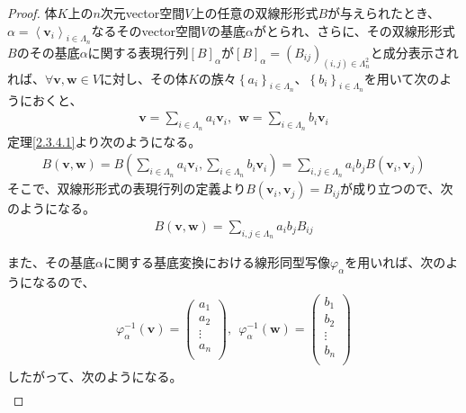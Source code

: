 \documentclass[dvipdfmx]{jsarticle}
\begin{document}
\begin{proof}
体$K$上の$n$次元vector空間$V$上の任意の双線形形式$B$が与えられたとき、$\alpha = \left\langle \mathbf{v}_{i} \right\rangle_{i \in \varLambda_{n}}$なるそのvector空間$V$の基底$\alpha$がとられ、さらに、その双線形形式$B$のその基底$\alpha$に関する表現行列$[ B]_{\alpha}$が$[ B]_{\alpha} = \left( B_{ij} \right)_{(i,j) \in \varLambda_{n}^{2}}$と成分表示されれば、$\forall\mathbf{v},\mathbf{w} \in V$に対し、その体$K$の族々$\left\{ a_{i} \right\}_{i \in \varLambda_{n}}$、$\left\{ b_{i} \right\}_{i \in \varLambda_{n}}$を用いて次のようにおくと、
\begin{align*}
\mathbf{v} = \sum_{i \in \varLambda_{n}} {a_{i}\mathbf{v}_{i}},\ \ \mathbf{w} = \sum_{i \in \varLambda_{n}} {b_{i}\mathbf{v}_{i}}
\end{align*}
定理\ref{2.3.4.1}より次のようになる。
\begin{align*}
B\left( \mathbf{v},\mathbf{w} \right) = B\left( \sum_{i \in \varLambda_{n}} {a_{i}\mathbf{v}_{i}},\sum_{i \in \varLambda_{n}} {b_{i}\mathbf{v}_{i}} \right) = \sum_{i,j \in \varLambda_{n}} {a_{i}b_{j}B\left( \mathbf{v}_{i},\mathbf{v}_{j} \right)}
\end{align*}
そこで、双線形形式の表現行列の定義より$B\left( \mathbf{v}_{i},\mathbf{v}_{j} \right) = B_{ij}$が成り立つので、次のようになる。
\begin{align*}
B\left( \mathbf{v},\mathbf{w} \right) = \sum_{i,j \in \varLambda_{n}} {a_{i}b_{j}B_{ij}}
\end{align*}\par
また、その基底$\alpha$に関する基底変換における線形同型写像$\varphi_{\alpha}$を用いれば、次のようになるので、
\begin{align*}
\varphi_{\alpha}^{- 1}\left( \mathbf{v} \right) = \begin{pmatrix}
a_{1} \\
a_{2} \\
 \vdots \\
a_{n} \\
\end{pmatrix},\ \ \varphi_{\alpha}^{- 1}\left( \mathbf{w} \right) = \begin{pmatrix}
b_{1} \\
b_{2} \\
 \vdots \\
b_{n} \\
\end{pmatrix}
\end{align*}
したがって、次のようになる。
\begin{align*}

\end{align*}
\end{proof}
\end{document}
